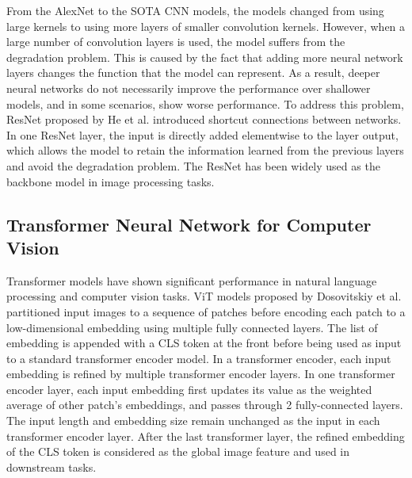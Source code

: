 \documentclass[12pt,twoside]{report}
\begin{document}
From the AlexNet\cite{alexnet} to the SOTA CNN models, the models changed from using large kernels to using more layers of smaller convolution kernels. However, when a large number of convolution layers is used, the model suffers from the degradation problem. This is caused by the fact that adding more neural network layers changes the function that the model can represent. As a result, deeper neural networks do not necessarily improve the performance over shallower models, and in some scenarios, show worse performance. To address this problem, ResNet\cite{resnet} proposed by He et al. introduced shortcut connections between networks. In one ResNet layer, the input is directly added elementwise to the layer output, which allows the model to retain the information learned from the previous layers and avoid the degradation problem. The ResNet has been widely used as the backbone model in image processing tasks. 


\subsection{Transformer Neural Network for Computer Vision}
Transformer models\cite{transformer} have shown significant performance in natural language processing\cite{transformer, gpt3, bert} and computer vision tasks\cite{vit, mae}. ViT models proposed by Dosovitskiy et al.\cite{vit} partitioned input images to a sequence of patches before encoding each patch to a low-dimensional embedding using multiple fully connected layers. The list of embedding is appended with a \<CLS\> token at the front before being used as input to a standard transformer encoder model. In a transformer encoder, each input embedding is refined by multiple transformer encoder layers. In one transformer encoder layer, each input embedding first updates its value as the weighted average of other patch's embeddings, and passes through 2 fully-connected layers. The input length and embedding size remain unchanged as the input in each transformer encoder layer. After the last transformer layer, the refined embedding of the \<CLS\> token is considered as the global image feature and used in downstream tasks. 
\end{document}
